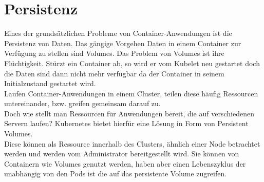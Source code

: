 \section{Persistenz}
Eines der grundsätzlichen Probleme von Container-Anwendungen ist die Persistenz von Daten. Das gängige Vorgehen Daten in einem Container zur Verfügung zu stellen sind Volumes. Das Problem von Volumes ist ihre Flüchtigkeit.
Stürzt ein Container ab, so wird er vom Kubelet neu gestartet doch die Daten sind dann nicht mehr verfügbar da der Container in seinem Initialzustand gestartet wird.\\
Laufen Container-Anwendungen in einem Cluster, teilen diese häufig Ressourcen untereinander, bzw. greifen gemeinsam darauf zu.\\
Doch wie stellt man Ressourcen für Anwendungen bereit, die auf verschiedenen Servern laufen?
Kubernetes bietet hierfür eine Lösung in Form von Persistent Volumes.\\
Diese können als Ressource innerhalb des Clusters, ähnlich einer Node betrachtet werden und werden vom Administrator bereitgestellt wird. Sie können von Containern wie Volumes genutzt werden, haben aber einen Lebenszyklus der unabhängig von den Pods ist die auf das persistente Volume zugreifen.
\newpage
